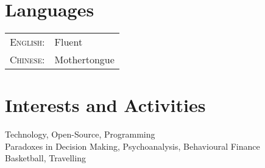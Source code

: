 \documentclass[a4paper,10pt]{article} %
\begin{document}

\section{Languages}

\begin{tabular}{rl}
\textsc{English:} & Fluent\\

\textsc{Chinese:} & Mothertongue\\

\end{tabular}




\section{Interests and Activities}

Technology, Open-Source, Programming\\
Paradoxes in Decision Making, Psychoanalysis, Behavioural Finance\\
Basketball, Travelling



\end{document}
